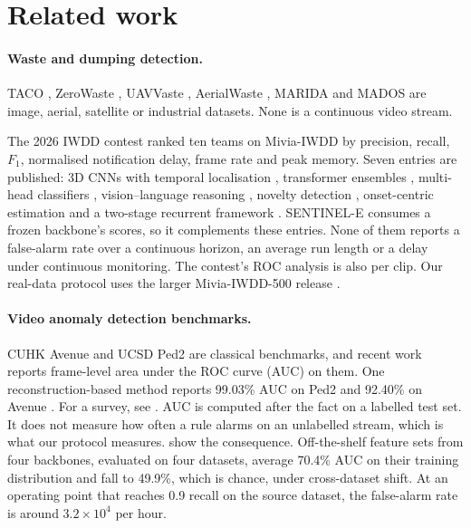 \section{Related work}
\label{sec:related}

\paragraph{Waste and dumping detection.}
TACO \citep{proenca2020taco}, ZeroWaste \citep{bashkirova2022zerowaste},
UAVVaste \citep{kraft2021uavvaste}, AerialWaste \citep{torres2023aerialwaste},
MARIDA \citep{kikaki2022marida} and MADOS \citep{kikaki2024mados} are image,
aerial, satellite or industrial datasets. None is a continuous video stream.

The 2026 IWDD contest \citep{bouwmans2026overview} ranked ten teams on Mivia-IWDD by
precision, recall, $F_1$, normalised notification delay, frame rate and peak memory.
Seven entries are published: 3D CNNs with temporal localisation
\citep{almorsy2026x3d}, transformer ensembles \citep{kim2026kfold}, multi-head
classifiers \citep{scarrica2026garberus}, vision--language reasoning
\citep{kairanbay2026vlm}, novelty detection \citep{zbuce2026novelty},
onset-centric estimation \citep{bhat2026imslab} and a two-stage recurrent framework
\citep{putzu2026unicass}. SENTINEL-E consumes a frozen backbone's scores, so it
complements these entries. None of them reports a false-alarm rate over a
continuous horizon, an average run length or a delay under continuous monitoring.
The contest's ROC analysis is also per clip. Our real-data protocol uses the larger
Mivia-IWDD-500 release \citep{greco2026iwdd}.

\paragraph{Video anomaly detection benchmarks.}
CUHK Avenue \citep{lu2013avenue} and UCSD Ped2 \citep{mahadevan2010ucsd} are
classical benchmarks, and recent work reports frame-level area under the ROC curve (AUC) on them. One
reconstruction-based method reports 99.03\% AUC on Ped2 and 92.40\% on Avenue
\citep{dong2025rvadign}. For a survey, see \citet{liu2024generalized}. AUC is
computed after the fact on a labelled test set. It does not measure how often a
rule alarms on an unlabelled stream, which is what our protocol measures.
\citet{rashidi2026benchmarkauc} show the consequence. Off-the-shelf feature sets from
four backbones, evaluated on four datasets, average 70.4\% AUC on their training
distribution and fall to 49.9\%, which is chance, under cross-dataset shift. At an
operating point that reaches 0.9 recall on the source dataset, the false-alarm
rate is around $3.2\times 10^{4}$ per hour.

